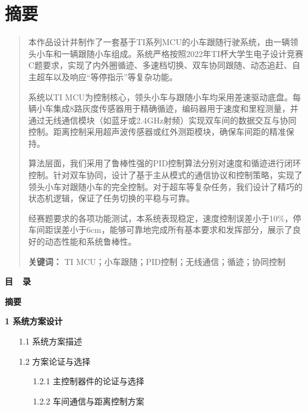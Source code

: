\documentclass[UTF8]{ctexart}
\begin{document}
\section*{摘要}
\begin{quote}
    \noindent
    本作品设计并制作了一套基于TI系列MCU的小车跟随行驶系统，由一辆领头小车和一辆跟随小车组成。系统严格按照2022年TI杯大学生电子设计竞赛C题要求，实现了内外圈循迹、多速档切换、双车协同跟随、动态追赶、自主超车以及响应``等停指示''等复杂功能。

    系统以TI MCU为控制核心，领头小车与跟随小车均采用差速驱动底盘。每辆小车集成8路灰度传感器用于精确循迹，编码器用于速度和里程测量，并通过无线通信模块（如蓝牙或2.4GHz射频）实现双车间的数据交互与协同控制。距离控制采用超声波传感器或红外测距模块，确保车间距的精准保持。

    算法层面，我们采用了鲁棒性强的PID控制算法分别对速度和循迹进行闭环控制。针对双车协同，设计了基于主从模式的通信协议和控制策略，实现了领头小车对跟随小车的完全控制。对于超车等复杂任务，我们设计了精巧的状态机逻辑，保证了任务切换的平稳与可靠。

    经赛题要求的各项功能测试，本系统表现稳定，速度控制误差小于10\%，停车间距误差小于6cm，能够可靠地完成所有基本要求和发挥部分，展示了良好的动态性能和系统鲁棒性。

    \vspace{1cm}
    \noindent
    \textbf{关键词：} TI MCU；小车跟随；PID控制；无线通信；循迹；协同控制
\end{quote}

\newpage

\begin{center}
    {\Large \bfseries 目\ \ 录}
\end{center}
\vspace{1cm}

\noindent
\textbf{摘要} 

\noindent
\textbf{1 系统方案设计} 
\begin{itemize}
    \item[1.1] 系统方案描述 
    \item[1.2] 方案论证与选择 
    \begin{itemize}
        \item[1.2.1] 主控制器件的论证与选择 
        \item[1.2.2] 车间通信与距离控制方案 
    \end{itemize}
\end{itemize}
\end{document}
